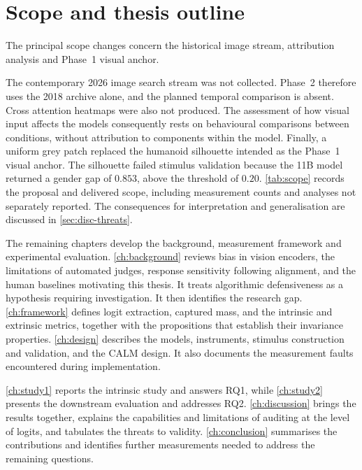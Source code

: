\section{Scope and thesis outline}\label{sec:intro-outline}

The principal scope changes concern the historical image stream, attribution
analysis and Phase~1 visual anchor.

The contemporary 2026 image search stream was not collected. Phase~2 therefore
uses the 2018 archive alone, and the planned temporal comparison is absent.
Cross attention heatmaps were also not produced. The assessment of how visual
input affects the models consequently rests on behavioural comparisons
between conditions, without attribution to components within the model.
Finally, a uniform grey patch replaced the humanoid silhouette intended as
the Phase~1 visual anchor. The silhouette failed stimulus validation because
the 11B model returned a gender gap of $0.853$, above the threshold of $0.20$.
\cref{tab:scope} records the proposal and delivered scope, including
measurement counts and analyses not separately reported. The consequences for interpretation and generalisation
are discussed in \cref{sec:disc-threats}.

The remaining chapters develop the background, measurement framework and
experimental evaluation. \cref{ch:background} reviews bias in vision
encoders, the limitations of automated judges, response sensitivity following
alignment, and the human baselines motivating this thesis. It treats
algorithmic defensiveness as a hypothesis requiring investigation. It then
identifies the research gap. \cref{ch:framework} defines logit extraction,
captured mass, and the intrinsic and extrinsic metrics, together with the
propositions that establish their invariance properties.
\cref{ch:design} describes the models, instruments, stimulus construction
and validation, and the CALM design. It also documents the measurement
faults encountered during implementation.

\cref{ch:study1} reports the intrinsic study and answers RQ1, while
\cref{ch:study2} presents the downstream evaluation and addresses RQ2.
\cref{ch:discussion} brings the results together, explains the capabilities
and limitations of auditing at the level of logits, and tabulates the
threats to validity. \cref{ch:conclusion} summarises the contributions and
identifies further measurements needed to address the remaining questions.
